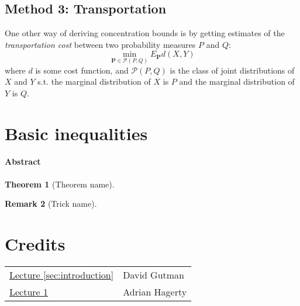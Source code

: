 \documentclass{amsproc}
\newtheorem{theorem}{Theorem}
\newtheorem{remark}[theorem]{Remark}
\newcommand{\fref}[2]{\hyperref[#2]{#1 \ref*{#2}}}
\begin{document}
	\subsection*{Method 3: Transportation}

	One other way of deriving concentration bounds is by getting estimates of the \textit{transportation cost} between two probability measures $P$ and $Q$:
	\[
		\min_{\mathbf{P}\in\mathcal{P}(P,Q)}E_\mathbf{P}d(X,Y)
	\]
	where $d$ is some cost function, and $\mathcal{P}(P,Q)$ is the class of joint distributions of $X$ and $Y$ s.t. the marginal distribution of $X$ is $P$ and the marginal distribution of $Y$ is $Q$.


\section{Basic inequalities}
\label{sec:basic_inequalites}
\paragraph{\textbf{Abstract}}
\lipsum[1]

\begin{theorem}[Theorem name]
\label{thm:reference-name}
\end{theorem}

\begin{remark}[Trick name]
\label{rmk:reference-name}
\end{remark}


\appendix
\newpage
\section*{Credits}
\begin{tabular}{ll}
	\fref{Lecture}{sec:introduction}
	&David Gutman
	\\
	\fref{Lecture}{sec:basic_inequalites}
	&Adrian Hagerty
\end{tabular}
\end{document}
